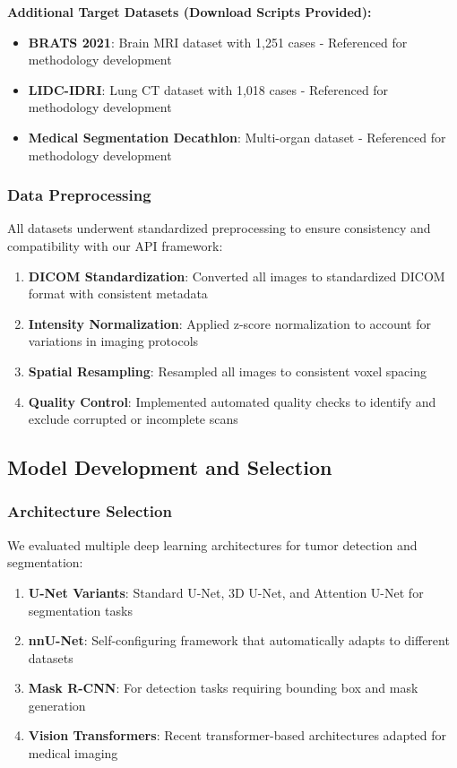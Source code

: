\documentclass[12pt,a4paper]{article}
\begin{document}
\textbf{Additional Target Datasets (Download Scripts Provided):}
\begin{itemize}
    \item \textbf{BRATS 2021}: Brain MRI dataset with 1,251 cases - Referenced for methodology development \cite{baheti2021brats}
    \item \textbf{LIDC-IDRI}: Lung CT dataset with 1,018 cases - Referenced for methodology development \cite{armato2011lidc}
    \item \textbf{Medical Segmentation Decathlon}: Multi-organ dataset - Referenced for methodology development \cite{simpson2019large}
\end{itemize}

\subsubsection{Data Preprocessing}

All datasets underwent standardized preprocessing to ensure consistency and compatibility with our API framework:

\begin{enumerate}
    \item \textbf{DICOM Standardization}: Converted all images to standardized DICOM format with consistent metadata
    \item \textbf{Intensity Normalization}: Applied z-score normalization to account for variations in imaging protocols
    \item \textbf{Spatial Resampling}: Resampled all images to consistent voxel spacing
    \item \textbf{Quality Control}: Implemented automated quality checks to identify and exclude corrupted or incomplete scans
\end{enumerate}

\subsection{Model Development and Selection}

\subsubsection{Architecture Selection}

We evaluated multiple deep learning architectures for tumor detection and segmentation:

\begin{enumerate}
    \item \textbf{U-Net Variants}: Standard U-Net, 3D U-Net, and Attention U-Net for segmentation tasks
    \item \textbf{nnU-Net}: Self-configuring framework that automatically adapts to different datasets \cite{isensee2021nnunet}
    \item \textbf{Mask R-CNN}: For detection tasks requiring bounding box and mask generation
    \item \textbf{Vision Transformers}: Recent transformer-based architectures adapted for medical imaging
\end{enumerate}
\end{document}
